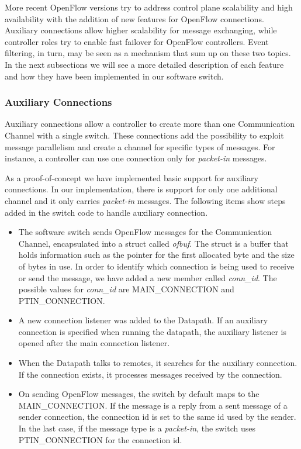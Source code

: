     More recent OpenFlow versions try to address control plane scalability and high availability with the addition of new features for OpenFlow connections. Auxiliary connections allow higher scalability for message exchanging, while controller roles try to enable fast failover for OpenFlow controllers. Event filtering, in turn, may be seen as a mechanism that sum up on these two topics. In the next subsections we will see a more detailed description of each feature and how they have been implemented in our software switch.
    
    \subsubsection{Auxiliary Connections}
    
    Auxiliary connections allow a controller to create more than one Communication Channel with a single switch. These connections add the possibility to exploit message parallelism and create a channel for specific types of messages. For instance, a controller can use one connection only for \textit{packet-in} messages. 
    
    As a proof-of-concept we have implemented basic support for auxiliary connections. In our implementation, there is support for only one additional channel and it only carries \textit{packet-in} messages. The following items show steps added in the switch code to handle auxiliary connection.
    
    \begin{itemize}
    \item The software switch sends OpenFlow messages for the Communication Channel, encapsulated into a struct called \textit{ofbuf}. The struct is a buffer that holds information such as the pointer for the first allocated byte and the size of bytes in use. In order to identify which connection is being used to receive or send the message, we have added a new member called \textit{conn_id}. The possible values for \textit{conn_id} are MAIN_CONNECTION and PTIN_CONNECTION.  
    
    \item A new connection listener was added to the Datapath. If an auxiliary connection is specified when running the datapath, the auxiliary listener is opened after the main connection listener.
    
    \item When the Datapath talks to remotes, it searches for the auxiliary connection. If the connection exists, it processes messages received by the connection.
    
    \item On sending OpenFlow messages, the switch by default maps to the MAIN_CONNECTION. If the message is a reply from  a sent message of a sender connection, the connection id is set to the same id used by the sender. In the last case, if the message type is a \textit{packet-in}, the switch uses PTIN_CONNECTION for the connection id. 
    
    \end{itemize}
    
